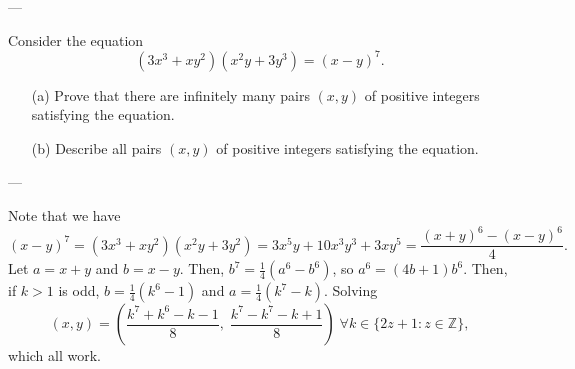 
---

Consider the equation \[(3x^3+xy^2)(x^2y+3y^3)=(x-y)^7.\]
\begin{enumerate}[itemsep=0em]
    \item[(a)] Prove that there are infinitely many pairs $(x,y)$ of positive integers satisfying the equation.
    \item[(b)] Describe all pairs $(x,y)$ of positive integers satisfying the equation.
\end{enumerate}

---

Note that we have \[(x-y)^7=(3x^3+xy^2)(x^2y+3y^2)=3x^5y+10x^3y^3+3xy^5=\frac{(x+y)^6-(x-y)^6}4.\]
Let $a=x+y$ and $b=x-y$. Then, $b^7=\tfrac14(a^6-b^6)$, so $a^6=(4b+1)b^6$. Then, if $k>1$ is odd, $b=\tfrac14(k^6-1)$ and $a=\tfrac14(k^7-k)$. Solving \[\boxed{(x,y)=\left(\frac{k^7+k^6-k-1}8,\;\frac{k^7-k^7-k+1}8\right)\;\forall k\in\{2z+1:z\in\mathbb Z\}},\]
which all work.
